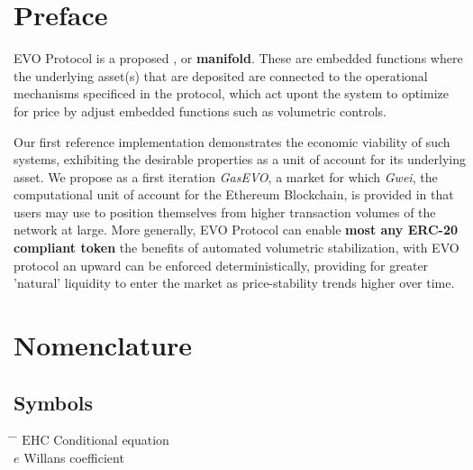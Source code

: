 
\chapter*{Preface}

EVO Protocol is a proposed , or \textbf{manifold}.
These are embedded functions where the underlying asset(s) that are deposited are connected to the operational mechanisms specificed in the protocol, which act upont the system to optimize for price by adjust embedded functions such as volumetric controls.\\
    \vspace{2mm}
    
Our first reference implementation demonstrates the economic viability of such systems, exhibiting the desirable properties as a unit of account for its underlying asset.
We propose as a first iteration \textit{GasEVO}, a market for  which\textit{ Gwei}, the computational unit of account for the Ethereum Blockchain, is provided in that users may use to position themselves from higher transaction volumes of the network at large.
  \vspace{2mm}
More generally, EVO Protocol can enable \textbf{most any ERC-20 compliant token} the benefits of automated volumetric stabilization, with EVO protocol an upward  can be enforced deterministically, providing for greater 'natural' liquidity to enter the market as price-stability trends higher over time. 


 \cleardoublepage


 \setcounter{tocdepth}{2}
 \tableofcontents

 \cleardoublepage



\chapter*{Nomenclature}\label{chap:symbole}

\section*{Symbols}
\begin{tabbing}
 \hspace*{1.6cm} \= \hspace*{8cm} \= \kill
$\mathrm{EHC}$ \> Conditional equation \> [$-$] \\[0.5ex]
$e$ \> Willans coefficient \> [$-$] \\
\end{tabbing}


